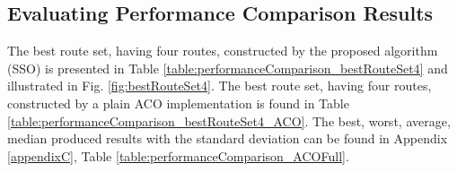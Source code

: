 \subsection{Evaluating Performance Comparison Results}


The best route set, having four routes, constructed by the proposed algorithm (SSO) is presented in Table \vref{table:performanceComparison_bestRouteSet4} and illustrated in Fig. \vref{fig:bestRouteSet4}. The best route set, having four routes, constructed by a plain ACO implementation is found in Table \vref{table:performanceComparison_bestRouteSet4_ACO}. The best, worst, average, median produced results with the standard deviation can be found in Appendix \ref{appendixC}, Table \vref{table:performanceComparison_ACOFull}. 

